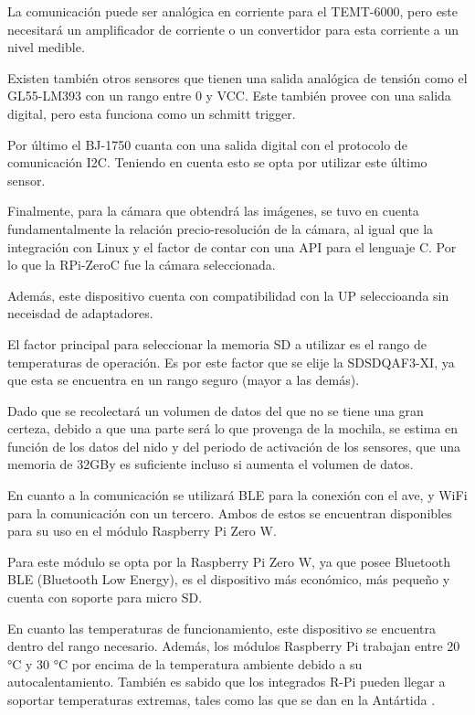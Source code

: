 La comunicación puede ser analógica en corriente para el TEMT-6000, pero este necesitará un amplificador de corriente o un convertidor para esta corriente a un nivel medible.

Existen también otros sensores que tienen una salida analógica de tensión como el GL55-LM393 con un rango entre 0 y VCC. Este también provee con una salida digital, pero esta funciona como un schmitt trigger.

Por último el BJ-1750 cuanta con una salida digital con el protocolo de comunicación I2C. Teniendo en cuenta esto se opta por utilizar este último sensor. 


Finalmente, para la cámara que obtendrá las imágenes, se tuvo en cuenta fundamentalmente la relación precio-resolución de la cámara, al igual que la integración con Linux y el factor de contar con una API para el lenguaje C. Por lo que la RPi-ZeroC fue la cámara seleccionada.

Además, este dispositivo cuenta con compatibilidad con la UP seleccioanda sin neceisdad de adaptadores.


El factor principal para seleccionar la memoria SD a utilizar es el rango de temperaturas de operación. Es por este factor que se elije la SDSDQAF3-XI, ya que esta se encuentra en un rango seguro (mayor a las demás).

Dado que se recolectará un volumen de datos del que no se tiene una gran certeza, debido a que una parte será lo que provenga de la mochila, se estima en función de los datos del nido y del periodo de activación de los sensores, que una memoria de 32GBy es suficiente incluso si aumenta el volumen de datos.


En cuanto a la comunicación se utilizará BLE para la conexión con el ave, y WiFi para la comunicación con un tercero.
Ambos de estos se encuentran disponibles para su uso en el módulo Raspberry Pi Zero W.

Para este módulo se opta por la Raspberry Pi Zero W, ya que posee Bluetooth BLE (Bluetooth Low Energy), es el dispositivo más económico, más pequeño y cuenta con soporte para micro SD.

En cuanto las temperaturas de funcionamiento, este dispositivo se encuentra dentro del rango necesario. Además, los módulos Raspberry Pi trabajan entre 20 °C y 30 °C por encima de la temperatura ambiente debido a su autocalentamiento. También es sabido que los integrados R-Pi pueden llegar a soportar temperaturas extremas, tales como las que se dan en la Antártida \cite{ref:Penguin}.

